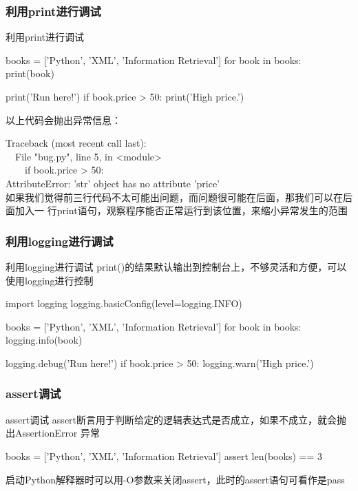 \subsubsection{利用print进行调试}
\begin{frame}[fragile]{利用print进行调试}
  \begin{python}
books = ['Python', 'XML', 'Information Retrieval']
for book in books:
    print(book)

print('Run here!') 
if book.price > 50:
    print('High price.')
  \end{python}

以上代码会抛出异常信息：

Traceback (most recent call last): \\
~~File "bug.py", line 5, in <module> \\
~~~~if book.price > 50: \\
AttributeError: 'str' object has no attribute 'price'\\

如果我们觉得前三行代码不太可能出问题，而问题很可能在后面，那我们可以在后面加入一
行print语句，观察程序能否正常运行到该位置，来缩小异常发生的范围
\end{frame}

\subsubsection{利用logging进行调试}
\begin{frame}[fragile]{利用logging进行调试}
  print()的结果默认输出到控制台上，不够灵活和方便，可以使用logging进行控制

  \begin{python}
import logging
logging.basicConfig(level=logging.INFO)

books = ['Python', 'XML', 'Information Retrieval']
for book in books:
    logging.info(book)

logging.debug('Run here!') 
if book.price > 50:
    logging.warn('High price.')
  \end{python}
\end{frame}

\subsubsection{assert调试}
\begin{frame}[fragile]{assert调试}
  assert断言用于判断给定的逻辑表达式是否成立，如果不成立，就会抛出AssertionError
  异常

\begin{python}
books = ['Python', 'XML', 'Information Retrieval']
assert len(books) == 3
\end{python}

启动Python解释器时可以用-O参数来关闭assert，此时的assert语句可看作是pass
\end{frame}

